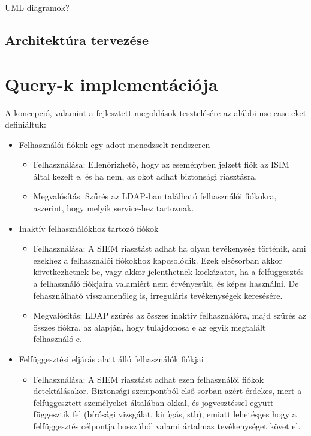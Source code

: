 \todo UML diagramok?
\subsection{Architektúra tervezése}


\section{Query-k implementációja} \label{sec:queryk}
A koncepció, valamint a fejlesztett megoldások tesztelésére az alábbi use-case-eket definiáltuk:

\begin{itemize}
	\item Felhasználói fiókok egy adott menedzselt rendszeren
	\begin{itemize}
		\small
		\item Felhasználása: Ellenőrizhető, hogy az eseményben jelzett fiók az ISIM által kezelt e, és ha nem, az okot adhat biztonsági riasztásra.
		\item Megvalósítás: Szűrés az LDAP-ban található felhasználói fiókokra, aszerint, hogy melyik service-hez tartoznak.
	\end{itemize} 
	\item Inaktív felhasználókhoz tartozó fiókok
	\begin{itemize}
		\small
		\item Felhasználása: A SIEM riasztást adhat ha olyan tevékenység történik, ami ezekhez a felhasználói fiókokhoz kapcsolódik. Ezek elsősorban akkor következhetnek be, vagy akkor jelenthetnek kockázatot, ha a felfüggesztés a felhasználó fiókjaira valamiért nem érvényesült, és képes használni. De fehasználható visszamenőleg is, irreguláris tevékenységek keresésére.
		\item Megvalósítás: LDAP szűrés az összes inaktív felhasználóra, majd szűrés az összes fiókra, az alapján, hogy tulajdonosa e az egyik megtalált felhasználó e.
	\end{itemize}
	\item Felfüggesztési eljárás alatt álló felhasználók fiókjai
	\begin{itemize}
		\small
		\item Felhasználása: A SIEM riasztást adhat ezen felhasználói fiókok detektálásakor. Biztonsági szempontból első sorban azért érdekes, mert a felfüggesztett személyeket általában okkal, és jogvesztéssel együtt függesztik fel (bírósági vizsgálat, kirúgás, stb), emiatt lehetésges hogy a felfüggesztés célpontja bosszúból valami ártalmas tevékenységet követ el.

\end{itemize}
\end{itemize}
